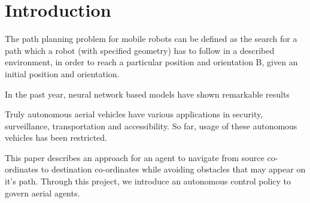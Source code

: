\section{Introduction}
The path planning problem for mobile robots can be defined as the search for a path which a robot (with specified geometry) has to follow in a described environment, in order to reach a particular position and orientation B, given an initial position and orientation. ~\cite{Liu_2015_CVPR} 

In the past year, neural network based models have shown remarkable results ~\cite{Liu_2015_CVPR}

Truly autonomous aerial vehicles have various applications in security, surveillance, transportation and accessibility. So far, usage of these autonomous vehicles has been restricted. 

This paper describes an approach for an agent to navigate from source co-ordinates to destination co-ordinates while avoiding obstacles that may appear on it's path. Through this project, we introduce an autonomous control policy to govern aerial agents.

